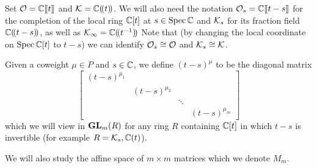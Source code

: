 \documentclass[draft]{article}
\begin{document}
Set $\cO = \CC\xt$ and $\cK = \CC\xT$. We will also need the notation $\cO_s = \CC\xt[t-s]$ for the completion of the local ring $\CC[t]$ at $s\in\spec\CC$ and $\cK_s$ for its fraction field $\CC\xT[t-s]$, as well as $\Kinf = \CC\xT[t^{-1}]$   
% 
Note that (by changing the local coordinate on $\spec\CC[t]$ to $t-s$) we can identify $\cO_s \cong \cO$ and $\cK_s\cong\cK$. 

Given a coweight $\mu \in P$ and $ s\in \CC$, we define $ (t-s)^\mu$ to be the diagonal matrix 
\[
\begin{bmatrix}
    (t-s)^{\mu_1} \\
    & (t-s)^{\mu_2} \\ 
    & & \ddots \\
    & & & (t-s)^{\mu_m}
\end{bmatrix} 
\]
which we will view in $\GL_m(R) $ for any ring $ R $ containing $\CC[t]$ in which $t-s$ is invertible (for example $ R = \Ks, \CC(t)$).

We will also study the affine space of $m\times m$ matrices which we denote $ M_m$.
% 
\end{document}
